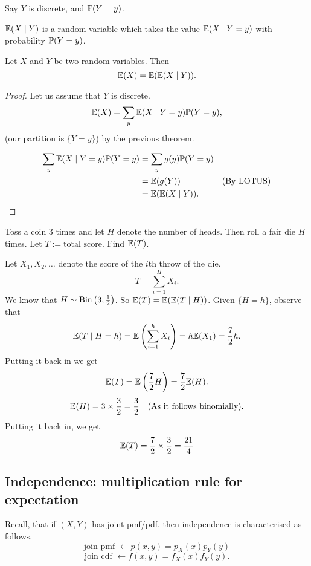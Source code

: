 \documentclass[10pt, a4paper]{article}
\begin{document}
Say $Y$ is discrete,
and $\P(Y = y)$.

$\E(X \mid Y)$ is a random variable which takes the value $\E(X \mid Y = y)$ with probability $\P(Y = y)$.

\begin{theorem}
    Let $X$ and $Y$ be two random variables.
    Then
    \[
    \E(X) = \E(\E(X \mid Y)).
    \]
    \begin{proof}
        Let us assume that $Y$ is discrete.
        \[
        \E(X) = \sum_{y}\E(X \mid Y = y)\P(Y = y),
        \]
        (our partition is $\{Y = y\}$)
        by the previous theorem.

        \begin{align*}
            \sum_{y}\E(X \mid Y = y)\P(Y = y) &= \sum_{y}g(y)\P(Y = y) \\
            &= \E(g(Y)) &(\text{By LOTUS}) \\
            &= \E(\E(X \mid Y)).
        \end{align*}
    \end{proof}
\end{theorem}

\begin{example}
    Toss a coin $3$ times and let $H$ denote the number of heads.
    Then roll a fair die $H$ times.
    Let $T := \text{total score}$.
    Find $\E(T)$.

    Let $X_1, X_2, \dotsc$ denote the score of the $i$th throw of the die.
    \[
    T = \sum_{i = 1}^{H}X_i.
    \]
    We know that $H \sim \Bin\left(3, \frac{1}{2}\right)$.
    So $\E(T) = \E(\E(T \mid H))$.
    Given $\{H = h\}$,
    observe that
    \[
    \E(T \mid H = h) = \E\left(\sum_{i = 1}^{h}X_i\right) = h\E(X_1) = \frac{7}{2}h.
    \]
    Putting it back in we get
    \[
    \E(T) = \E\left(\frac{7}{2}H\right) = \frac{7}{2}\E(H).
    \]
    \[
    \E(H) = 3 \times \frac{3}{2} = \frac{3}{2}\quad\text{(As it follows binomially)}.
    \]
    Putting it back in,
    we get
    \[
    \E(T) = \frac{7}{2} \times \frac{3}{2} = \frac{21}{4}
    \]
\end{example}

\subsection{Independence: multiplication rule for expectation}
Recall,
that if $(X, Y)$ has joint pmf/pdf,
then independence is characterised as follows.
\[
\text{join pmf } \leftarrow p(x, y) = p_X(x)p_Y(y)
\]
\[
\text{join cdf } \leftarrow f(x, y) = f_X(x)f_Y(y).
\]
\end{document}
